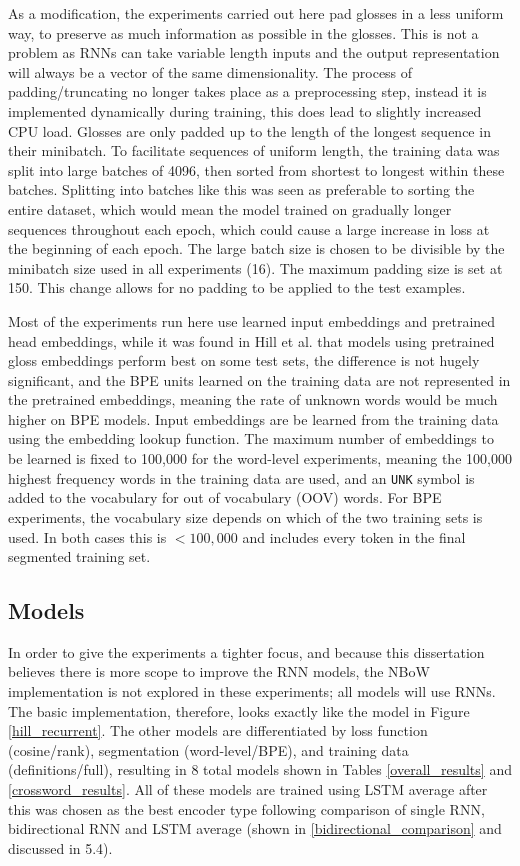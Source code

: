 \documentclass[11pt]{article}
\begin{document}
\begin{spacing}{1}
As a modification, the experiments carried out here pad glosses in a less uniform way, to preserve as much information as possible in the glosses. This is not a problem as RNNs can take variable length inputs and the output representation will always be a vector of the same dimensionality. The process of padding/truncating no longer takes place as a preprocessing step, instead it is implemented dynamically during training, this does lead to slightly increased CPU load. Glosses are only padded up to the length of the longest sequence in their minibatch. To facilitate sequences of uniform length, the training data was split into large batches of 4096, then sorted from shortest to longest within these batches. Splitting into batches like this was seen as preferable to sorting the entire dataset, which would mean the model trained on gradually longer sequences throughout each epoch, which could cause a large increase in loss at the beginning of each epoch. The large batch size is chosen to be divisible by the minibatch size used in all experiments (16). The maximum padding size is set at 150. This change allows for no padding to be applied to the test examples.

Most of the experiments run here use learned input embeddings and pretrained head embeddings, while it was found in Hill et al. \citeyear{hill2015learning} that models using pretrained gloss embeddings perform best on some test sets, the difference is not hugely significant, and the BPE units learned on the training data are not represented in the pretrained embeddings, meaning the rate of unknown words would be much higher on BPE models. Input embeddings are be learned from the training data using the embedding lookup function. The maximum number of embeddings to be learned is fixed to 100,000 for the word-level experiments, meaning the 100,000 highest frequency words in the training data are used, and an \texttt{UNK} symbol is added to the vocabulary for out of vocabulary (OOV) words. For BPE experiments, the vocabulary size depends on which of the two training sets is used. In both cases this is $<100,000$ and includes every token in the final segmented training set. 

\subsection{Models}

In order to give the experiments a tighter focus, and because this dissertation believes there is more scope to improve the RNN models, the NBoW implementation is not explored in these experiments; all models will use RNNs. The basic implementation, therefore, looks exactly like the model in Figure \ref{hill_recurrent}. The other models are differentiated by loss function (cosine/rank), segmentation (word-level/BPE), and training data (definitions/full), resulting in 8 total models shown in Tables \ref{overall_results} and \ref{crossword_results}. All of these models are trained using LSTM average after this was chosen as the best encoder type following comparison of single RNN, bidirectional RNN and LSTM average (shown in \ref{bidirectional_comparison} and discussed in 5.4).


\end{spacing}
\end{document}
